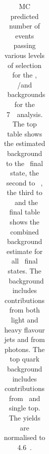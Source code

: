 \begin{table}[htbp]
\begin{tabular}{rccc}
  \end{tabular}
  \caption[MC predicted number of events passing various levels of selection for
  the \ZX, \WZ/\WW and \topquark\ backgrounds for the 7~\tev\ analysis.]
  {MC predicted number of events passing various levels of selection for
  the \ZX, \WZ/\WW and \topquark\ backgrounds for the 7~\tev\ analysis. The top table shows the estimated background to the \eeee\
  final state, the second to \mmmm\ , the third to \eemm\ and
  the final table shows the combined background estimate for all \llll\ final
  states. The
  \ZX\ background includes contributions from both light and heavy flavour
  jets and from photons. The top quark background includes contributions from \ttbar\ and
  single top. The yields are normalised to 4.6~\ifb.
  }
  \label{table:mc-bg-seven}
\end{table}

